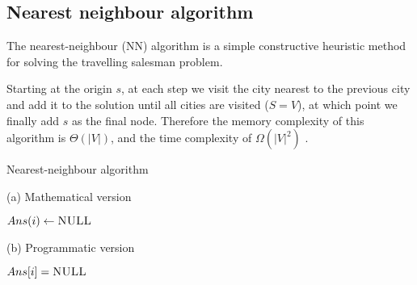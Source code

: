 \subsection{Nearest neighbour algorithm} \label{algorithm-tsp-nn}
The nearest-neighbour (NN) algorithm is a simple \gls{constructive} heuristic method for solving the travelling salesman problem.\par
Starting at the origin $s$, at each step we visit the city nearest to the previous city and add it to the solution until all cities are visited ($S = V$), at which point we finally add $s$ as the final node.
Therefore the memory complexity of this algorithm is $\Theta (|V|)$, and the time complexity of $\Omega (|V|^{2})$ \cite{reinelt}.
\begin{algorithm}[ht]
    \caption{Nearest-neighbour algorithm}
    \label{alg:nearest neighbour}
    \begin{minipage}[t]{0.49\linewidth}
        (a) Mathematical version
        \begin{algorithmic}[1]
                 {$Ans(i) \gets \textsc{NULL}$}
                \EndFor
                \EndFor
                \State {}
            \EndFunction
        \end{algorithmic}
    \end{minipage}
    \begin{minipage}[t]{0.49\linewidth}
        (b) Programmatic version
        \begin{algorithmic}[1]
                 {$Ans[i] = \textsc{NULL}$}
                \EndFor
                        \EndIf
                    \EndFor
                \EndFor
                \State {}
            \EndFunction
        \end{algorithmic}
    \end{minipage}
\end{algorithm}

